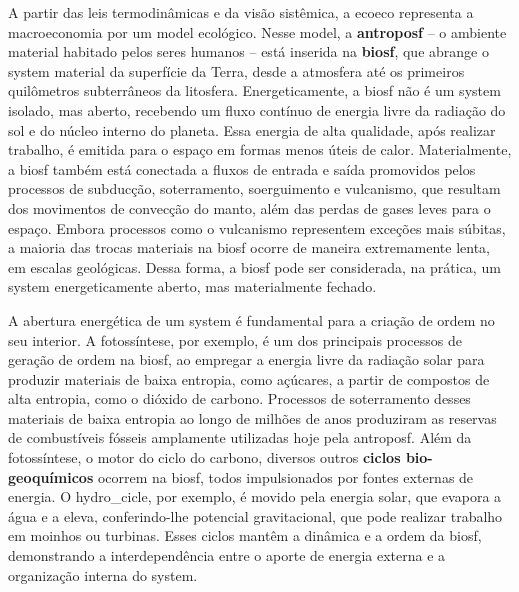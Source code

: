 \documentclass[./main.tex]{subfiles}
\begin{document}
\par A partir das leis termodinâmicas e da visão sistêmica, a \gls{ecoeco} representa a macroeconomia por um \gls{model} ecológico. Nesse \gls{model}, a \textbf{\gls{antroposf}} – o ambiente material habitado pelos seres humanos – está inserida na \textbf{\gls{biosf}}, que abrange o \gls{system} material da superfície da Terra, desde a atmosfera até os primeiros quilômetros subterrâneos da litosfera. Energeticamente, a \gls{biosf} não é um \gls{system} isolado, mas aberto, recebendo um fluxo contínuo de energia livre da radiação do sol e do núcleo interno do planeta. Essa energia de alta qualidade, após realizar trabalho, é emitida para o espaço em formas menos úteis de calor. Materialmente, a \gls{biosf} também está conectada a fluxos de entrada e saída promovidos pelos processos de subducção, soterramento, soerguimento e vulcanismo, que resultam dos movimentos de convecção do manto, além das perdas de gases leves para o espaço. Embora processos como o vulcanismo representem exceções mais súbitas, a maioria das trocas materiais na \gls{biosf} ocorre de maneira extremamente lenta, em escalas geológicas. Dessa forma, a \gls{biosf} pode ser considerada, na prática, um \gls{system} energeticamente aberto, mas materialmente fechado.

\par A abertura energética de um \gls{system} é fundamental para a criação de ordem no seu interior. A fotossíntese, por exemplo, é um dos principais processos de geração de ordem na \gls{biosf}, ao empregar a energia livre da radiação solar para produzir materiais de baixa entropia, como açúcares, a partir de compostos de alta entropia, como o dióxido de carbono. Processos de soterramento desses materiais de baixa entropia ao longo de milhões de anos produziram as reservas de combustíveis fósseis amplamente utilizadas hoje pela \gls{antroposf}. Além da fotossíntese, o motor do ciclo do carbono, diversos outros \textbf{ciclos bio-geoquímicos} ocorrem na \gls{biosf}, todos impulsionados por fontes externas de energia. O \gls{hydro_cicle}, por exemplo, é movido pela energia solar, que evapora a água e a eleva, conferindo-lhe potencial gravitacional, que pode realizar trabalho em moinhos ou turbinas. Esses ciclos mantêm a dinâmica e a ordem da \gls{biosf}, demonstrando a interdependência entre o aporte de energia externa e a organização interna do \gls{system}.
\end{document}
